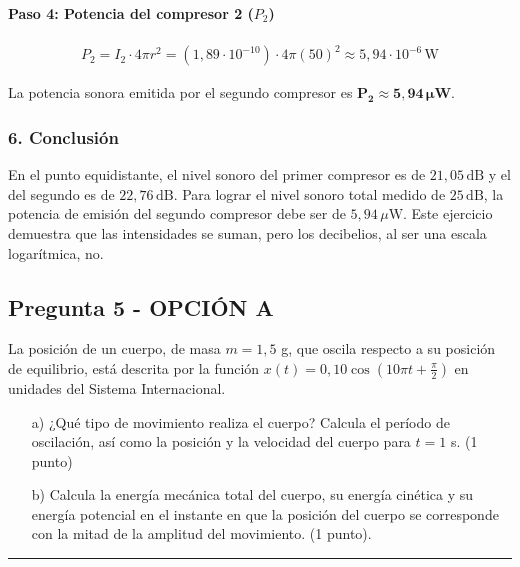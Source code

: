 \paragraph*{Paso 4: Potencia del compresor 2 ($P_2$)}
\begin{gather}
    P_2 = I_2 \cdot 4\pi r^2 = (1,89 \cdot 10^{-10}) \cdot 4\pi (50)^2 \approx 5,94 \cdot 10^{-6} \, \text{W}
\end{gather}
\begin{cajaresultado}
    La potencia sonora emitida por el segundo compresor es $\boldsymbol{P_2 \approx 5,94 \, \mu\textbf{W}}$.
\end{cajaresultado}

\subsubsection*{6. Conclusión}
\begin{cajaconclusion}
En el punto equidistante, el nivel sonoro del primer compresor es de $21,05\,\text{dB}$ y el del segundo es de $22,76\,\text{dB}$. Para lograr el nivel sonoro total medido de $25\,\text{dB}$, la potencia de emisión del segundo compresor debe ser de $5,94\,\mu\text{W}$. Este ejercicio demuestra que las intensidades se suman, pero los decibelios, al ser una escala logarítmica, no.
\end{cajaconclusion}
\newpage

\subsection{Pregunta 5 - OPCIÓN A}
\label{subsec:5A_2025_jun_ord}

\begin{cajaenunciado}
La posición de un cuerpo, de masa $m=1,5$ g, que oscila respecto a su posición de equilibrio, está descrita por la función $x(t)=0,10 \cos(10\pi t+\frac{\pi}{2})$ en unidades del Sistema Internacional.
\begin{enumerate}
    \item[a)] ¿Qué tipo de movimiento realiza el cuerpo? Calcula el período de oscilación, así como la posición y la velocidad del cuerpo para $t=1$ s. (1 punto)
    \item[b)] Calcula la energía mecánica total del cuerpo, su energía cinética y su energía potencial en el instante en que la posición del cuerpo se corresponde con la mitad de la amplitud del movimiento. (1 punto).
\end{enumerate}
\end{cajaenunciado}
\hrule

